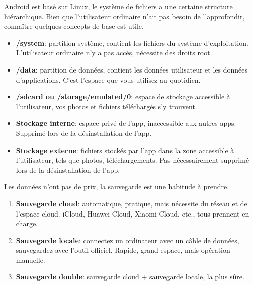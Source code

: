 
Android est basé sur Linux, le système de fichiers a une certaine structure hiérarchique. Bien que l'utilisateur ordinaire n'ait pas besoin de l'approfondir, connaître quelques concepts de base est utile.


\begin{itemize}
  \item \textbf{/system}: partition système, contient les fichiers du système d'exploitation. L'utilisateur ordinaire n'y a pas accès, nécessite des droits root.
  \item \textbf{/data}: partition de données, contient les données utilisateur et les données d'applications. C'est l'espace que vous utilisez au quotidien.
  \item \textbf{/sdcard ou /storage/emulated/0}: espace de stockage accessible à l'utilisateur, vos photos et fichiers téléchargés s'y trouvent.
\end{itemize}


\begin{itemize}
  \item \textbf{Stockage interne}: espace privé de l'app, inaccessible aux autres apps. Supprimé lors de la désinstallation de l'app.
  \item \textbf{Stockage externe}: fichiers stockés par l'app dans la zone accessible à l'utilisateur, tels que photos, téléchargements. Pas nécessairement supprimé lors de la désinstallation de l'app.
\end{itemize}


Les données n'ont pas de prix, la sauvegarde est une habitude à prendre.


\begin{enumerate}
  \item \textbf{Sauvegarde cloud}: automatique, pratique, mais nécessite du réseau et de l'espace cloud. iCloud, Huawei Cloud, Xiaomi Cloud, etc., tous prennent en charge.
  \item \textbf{Sauvegarde locale}: connectez un ordinateur avec un câble de données, sauvegardez avec l'outil officiel. Rapide, grand espace, mais opération manuelle.
  \item \textbf{Sauvegarde double}: sauvegarde cloud + sauvegarde locale, la plus sûre.
\end{enumerate}

